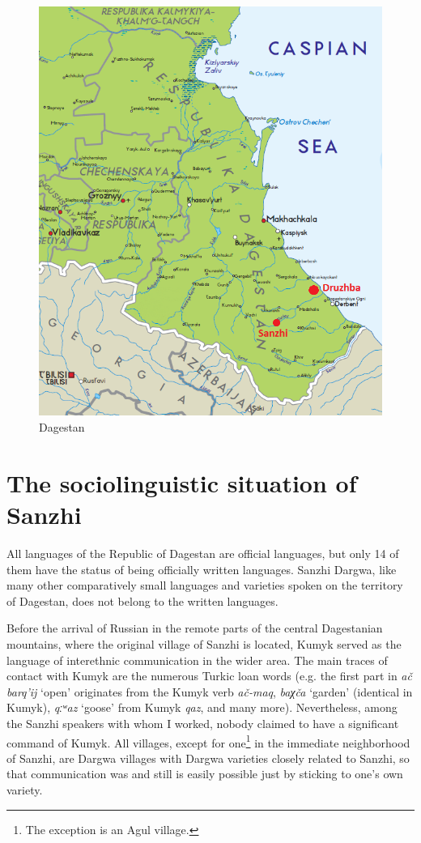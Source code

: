 \begin{figure}[t!]
	\caption{Dagestan}
	\label{fig:Map 2}
	\includegraphics[scale=0.7]{figures/Dagestan_Sanzhi.png}
\end{figure}


\section{The sociolinguistic situation of Sanzhi}
\label{sec:The sociolinguistic situation of Sanzhi}

All languages of the Republic of Dagestan are official languages, but only 14 of them have the status of being officially written languages. Sanzhi Dargwa, like many other comparatively small languages and varieties spoken on the territory of Dagestan, does not belong to the written languages.  

Before the arrival of Russian in the remote parts of the central Dagestanian mountains, where the original village of Sanzhi is located, Kumyk served as the language of interethnic communication in the wider area. The main traces of contact with Kumyk are the numerous Turkic loan words (e.g. the first part in \textit{ač barq'ij} `open' originates from the Kumyk verb \textit{ač-maq}, \textit{baχča} `garden' (identical in Kumyk), \textit{qːʷaz} `goose' from Kumyk \textit{qaz}, and many more). Nevertheless, among the Sanzhi speakers with whom I worked, nobody claimed to have a significant command of Kumyk. All villages, except for one\footnote{The exception is an Agul village.} in the immediate neighborhood of Sanzhi, are Dargwa villages with Dargwa varieties closely related to Sanzhi, so that communication was and still is easily possible just by sticking to one's own variety.

